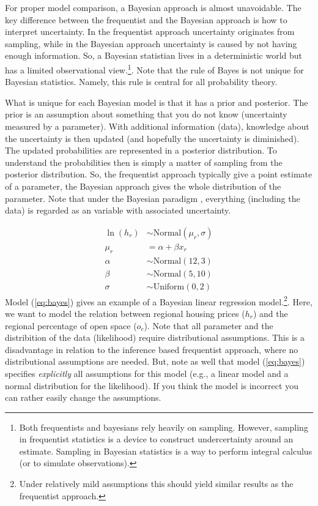\documentclass[fleqn,10pt]{SelfArx} %
\begin{document}
For proper model comparison, a Bayesian approach is almost unavoidable. The key
difference between the frequentist and the Bayesian approach is how to interpret
uncertainty. In the frequentist approach uncertainty originates from sampling,
while in the Bayesian approach uncertainty is caused by not having enough
information. So, a Bayesian statistian lives in a deterministic world but has
a limited observational view.\footnote{Both frequentists and bayesians rely
  heavily on sampling. However, sampling in frequentist statistics is a device to construct undercertainty
around an estimate. Sampling in Bayesian statistics is a way to perform integral
calculus (or to simulate observations).}. Note that the rule of Bayes is not
unique for Bayesian statistics. Namely, this rule is central for all probability
theory.

What is unique for each Bayesian model is that it has a prior and posterior. The
prior is an assumption about something that you do not know (uncertainty
measured by a parameter). With additional information (data), knowledge about
the uncertainty is then updated (and hopefully the uncertainty is diminished).
The updated probabilities are represented in a posterior distribution. To
understand the probabilities then is simply a matter of sampling from the
posterior distribution. So, the
frequentist approach typically give a point estimate of a parameter, the Bayesian approach
gives the whole distribution of the parameter. Note that under the Bayesian
paradigm , everything (including the data) is regarded as an variable with
associated uncertainty.

\begin{align}
  \ln(h_r) & \sim \text{Normal}(\mu_r, \sigma) \tag{likelihood}\\
  \mu_r & = \alpha + \beta x_r \tag{linear model}\\
  \alpha & \sim \text{Normal}(12,3) \tag{$\alpha$ prior}\\
  \beta & \sim \text{Normal}(5,10) \tag{$\beta$ prior}\\
  \sigma &\sim \text{Uniform}(0,2) \tag{$\sigma$ prior} 
  \label{eq:bayes}         
\end{align}
Model (\ref{eq:bayes}) gives an example of a Bayesian linear regression
model.\footnote{Under relatively mild assumptions this should yield similar
  results as the frequentist approach.}. Here, we want to model the relation
between regional housing prices ($h_r$) and the regional percentage of open
space ($o_c$). Note that all parameter and the distribition of the data
(likelihood) require distributional assumptions. This is a disadvantage in
relation to the inference based frequentist approach, where no distributional
assumptions are needed. But, note as well that model (\ref{eq:bayes}) specifies
\emph{explicitly} all assumptions for this model (e.g., a linear model and a
normal distribution for the likelihood). If you think the model is incorrect you
can rather easily change the assumptions.
\end{document}
